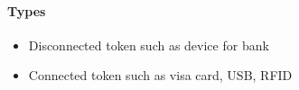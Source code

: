 \begin{itemize}
        \paragraph{Types}
        \begin{itemize}
            \item Disconnected token such as device for bank
            \item Connected token such as visa card, USB, RFID
        \end{itemize}

\end{itemize}

